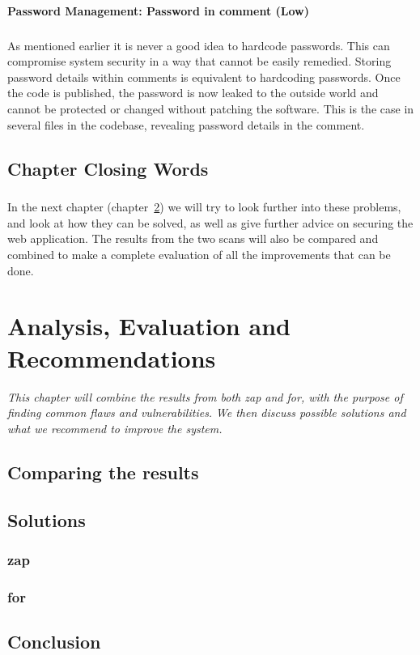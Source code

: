 \documentclass[11pt,english,a4paper]{report}
\begin{document}
\subsubsection{Password Management: Password in comment (Low)}
\paragraph{}
As mentioned earlier it is never a good idea to hardcode passwords. 
This can compromise system security in a way that cannot be easily remedied.
Storing password details within comments is equivalent to hardcoding passwords.
Once the code is published, the password is now leaked to the outside world and cannot be protected or changed without patching the software. 
This is the case in several files in the codebase, revealing password details in the comment.


\section{Chapter Closing Words}
\paragraph{}
In the next chapter (chapter~\ref{cha:part4}) we will try to look further into these problems, and look at how they can be solved, as well as give further advice on securing the web application.
The results from the two scans will also be compared and combined to make a complete evaluation of all the improvements that can be done.


\chapter{Analysis, Evaluation and Recommendations}
\label{cha:part4}

\textit{This chapter will combine the results from both \gls{zap} and \gls{for}, with the purpose of finding common flaws and vulnerabilities.}
\textit{We then discuss possible solutions and what we recommend to improve the system.}

\section{Comparing the results}

\section{Solutions}
\subsection{\gls{zap}}
\subsection{\gls{for}}
\section{Conclusion}

\newpage




\end{document}
